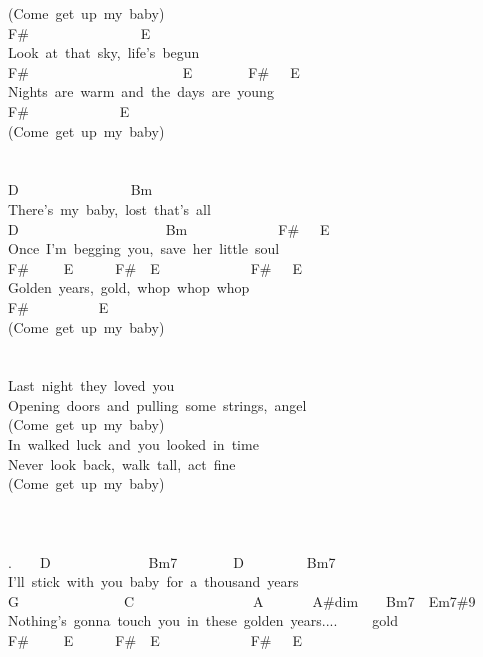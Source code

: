 {(Come\ get\ up\ my\ baby)\\
F\#\ \ \ \ \ \ \ \ \ \ \ \ \ \ \ \ E\\
Look\ at\ that\ sky,\ life's\ begun\\
F\#\ \ \ \ \ \ \ \ \ \ \ \ \ \ \ \ \ \ \ \ \ \ E\ \ \ \ \ \ \ \ F\#\ \ \ E\\
Nights\ are\ warm\ and\ the\ days\ are\ young\\
F\#\ \ \ \ \ \ \ \ \ \ \ \ \ E\\
(Come\ get\ up\ my\ baby)\\
\\
\\
D\ \ \ \ \ \ \ \ \ \ \ \ \ \ \ \ Bm\\
There's\ my\ baby,\ lost\ that's\ all\\
D\ \ \ \ \ \ \ \ \ \ \ \ \ \ \ \ \ \ \ \ \ Bm\ \ \ \ \ \ \ \ \ \ \ \ \ F\#\ \ \ E\\
Once\ I'm\ begging\ you,\ save\ her\ little\ soul\\
F\#\ \ \ \ \ E\ \ \ \ \ \ F\#\ \ E\ \ \ \ \ \ \ \ \ \ \ \ \ F\#\ \ \ E\\
Golden\ years,\ gold,\ whop\ whop\ whop\\
F\#\ \ \ \ \ \ \ \ \ \ E\\
(Come\ get\ up\ my\ baby)\\
\\
\\
Last\ night\ they\ loved\ you\ \\
Opening\ doors\ and\ pulling\ some\ strings,\ angel\\
(Come\ get\ up\ my\ baby)\\
In\ walked\ luck\ and\ you\ looked\ in\ time\\
Never\ look\ back,\ walk\ tall,\ act\ fine\\
(Come\ get\ up\ my\ baby)\\
\\
\\
\\
.\ \ \ \ D\ \ \ \ \ \ \ \ \ \ \ \ \ \ Bm7\ \ \ \ \ \ \ \ D\ \ \ \ \ \ \ \ \ Bm7\\
I'll\ stick\ with\ you\ baby\ for\ a\ thousand\ years\\
G\ \ \ \ \ \ \ \ \ \ \ \ \ \ \ C\ \ \ \ \ \ \ \ \ \ \ \ \ \ \ \ \ A\ \ \ \ \ \ \ A\#dim\ \ \ \ Bm7\ \ Em7\#9\\
Nothing's\ gonna\ touch\ you\ in\ these\ golden\ years....\ \ \ \ \ gold\\
F\#\ \ \ \ \ E\ \ \ \ \ \ F\#\ \ E\ \ \ \ \ \ \ \ \ \ \ \ \ F\#\ \ \ E\\
}
